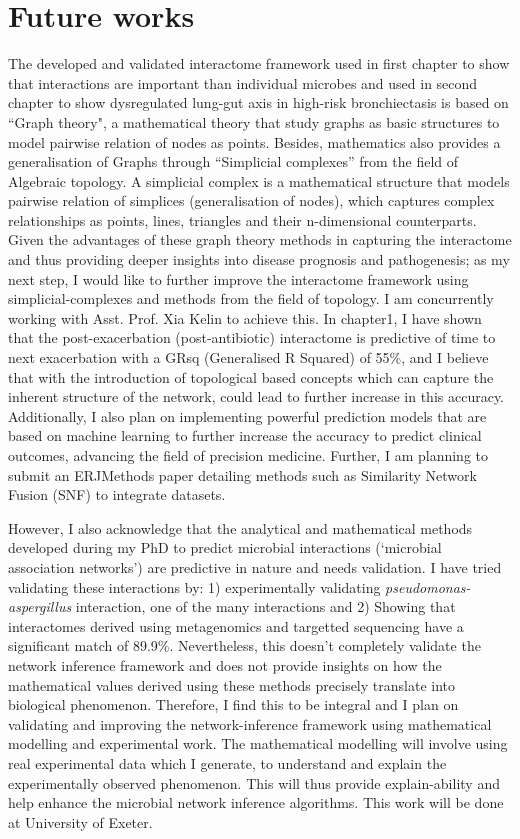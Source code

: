 \chapter*{Future works}

The developed and validated interactome framework used in first chapter to show that interactions are important than individual microbes and used in second chapter to show dysregulated lung-gut axis in high-risk bronchiectasis is based on ``Graph theory", a mathematical theory that study graphs as basic structures to model pairwise relation of nodes as points. Besides, mathematics also provides a generalisation of Graphs through ``Simplicial complexes'' from the field of Algebraic topology. A simplicial complex is a mathematical structure that models pairwise relation of simplices (generalisation of nodes), which captures complex relationships as points, lines, triangles and their n-dimensional counterparts. Given the advantages of these graph theory methods in capturing the interactome and thus providing deeper insights into disease prognosis and pathogenesis; as my next step, I would like to further improve the interactome framework using simplicial-complexes and methods from the field of topology. I am concurrently working with Asst. Prof. Xia Kelin to achieve this. In chapter1, I have shown that the post-exacerbation (post-antibiotic) interactome is predictive of time to next exacerbation with a GRsq (Generalised R Squared) of 55\%,
and I believe that with the introduction of topological based concepts which can capture the inherent structure of the network, could lead to further increase in this accuracy. Additionally, I also plan on implementing powerful prediction models that are based on machine learning to further increase the accuracy to predict clinical outcomes, advancing the field of precision medicine. Further, I am planning to submit an ERJMethods paper detailing methods such as Similarity Network Fusion (SNF) to integrate datasets.

However, I also acknowledge that the analytical and mathematical methods developed during my PhD to predict microbial interactions (`microbial association networks') are predictive in nature and needs validation. I have tried validating these interactions by: 1) experimentally validating \emph{pseudomonas-aspergillus} interaction, one of the many interactions and 2) Showing that interactomes derived using metagenomics and targetted sequencing have a significant match of 89.9\%. Nevertheless, this doesn't completely validate the network inference framework and does not provide insights on how the mathematical values derived using these methods precisely translate into biological phenomenon. Therefore, I find this to be integral and I plan on validating and improving the network-inference framework using mathematical modelling and experimental work. The mathematical modelling will involve using real experimental data which I generate, to understand and explain the experimentally observed phenomenon. This will thus provide explain-ability and help enhance the microbial network inference algorithms. This work will be done at University of Exeter.

